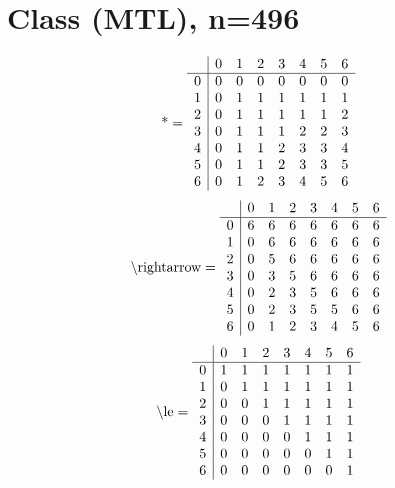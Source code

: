 \documentclass[11pt]{article}
\begin{document}
\section{Class (MTL), n=496}
\[\text{*} = 
\begin{array}{r | r r r r r r r}
 & 0 & 1 & 2 & 3 & 4 & 5 & 6 \\ \hline
0 & 0 & 0 & 0 & 0 & 0 & 0 & 0 \\
1 & 0 & 1 & 1 & 1 & 1 & 1 & 1 \\
2 & 0 & 1 & 1 & 1 & 1 & 1 & 2 \\
3 & 0 & 1 & 1 & 1 & 2 & 2 & 3 \\
4 & 0 & 1 & 1 & 2 & 3 & 3 & 4 \\
5 & 0 & 1 & 1 & 2 & 3 & 3 & 5 \\
6 & 0 & 1 & 2 & 3 & 4 & 5 & 6 \\
\end{array}
\]
\[\text{\textbackslash rightarrow} = 
\begin{array}{r | r r r r r r r}
 & 0 & 1 & 2 & 3 & 4 & 5 & 6 \\ \hline
0 & 6 & 6 & 6 & 6 & 6 & 6 & 6 \\
1 & 0 & 6 & 6 & 6 & 6 & 6 & 6 \\
2 & 0 & 5 & 6 & 6 & 6 & 6 & 6 \\
3 & 0 & 3 & 5 & 6 & 6 & 6 & 6 \\
4 & 0 & 2 & 3 & 5 & 6 & 6 & 6 \\
5 & 0 & 2 & 3 & 5 & 5 & 6 & 6 \\
6 & 0 & 1 & 2 & 3 & 4 & 5 & 6 \\
\end{array}
\]
\[\text{\textbackslash le} = 
\begin{array}{r | r r r r r r r}
 & 0 & 1 & 2 & 3 & 4 & 5 & 6 \\ \hline
0 & 1 & 1 & 1 & 1 & 1 & 1 & 1 \\
1 & 0 & 1 & 1 & 1 & 1 & 1 & 1 \\
2 & 0 & 0 & 1 & 1 & 1 & 1 & 1 \\
3 & 0 & 0 & 0 & 1 & 1 & 1 & 1 \\
4 & 0 & 0 & 0 & 0 & 1 & 1 & 1 \\
5 & 0 & 0 & 0 & 0 & 0 & 1 & 1 \\
6 & 0 & 0 & 0 & 0 & 0 & 0 & 1 \\
\end{array}
\]
\end{document}
